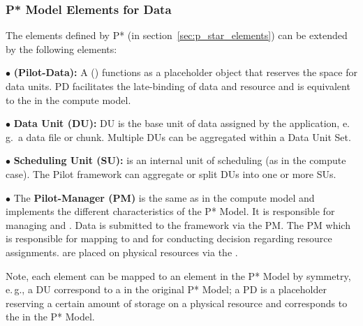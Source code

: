 \documentclass[conference]{IEEEtran}
\begin{document}

\subsubsection*{P* Model Elements for Data}


The elements defined by P* (in section~\ref{sec:p_star_elements}) can
be extended by the following elements:


\noindent$\bullet$
  \textbf{\pilot (Pilot-Data):} A \pilotdata (\pd) functions as a 
	placeholder object that reserves the space
	for data units. PD facilitates the late-binding of data and resource and is
	equivalent to the \pilot in the compute model.

\noindent$\bullet$
  \textbf{Data Unit (DU):} DU is the base unit of data assigned by
  the application,  e.\,g.\ a data file or chunk. Multiple DUs can be aggregated 
   within a Data Unit Set.


\noindent$\bullet$
  \textbf{Scheduling Unit (SU):} is an internal unit of scheduling (as in 
  the compute case). The Pilot framework can aggregate or split DUs into one 
  or more SUs.

\noindent$\bullet$ 
  The \textbf{Pilot-Manager (PM)} is the same as in the compute model and
  implements the different characteristics of the P* Model. It is responsible for
  managing \dus and \sus. Data is submitted to the framework via the PM. The PM
  which is responsible for mapping \dus to \sus and for conducting decision 
  regarding resource assignments. \sus are placed on physical resources via the \pilot.

Note, each element can be mapped to an element in the P* Model by
symmetry, e.\,g., a DU correspond to a \cu  in the original P* Model; 
a PD is a placeholder reserving a certain amount of storage on a physical 
resource and corresponds to the \pilot in the P* Model.
\end{document}
